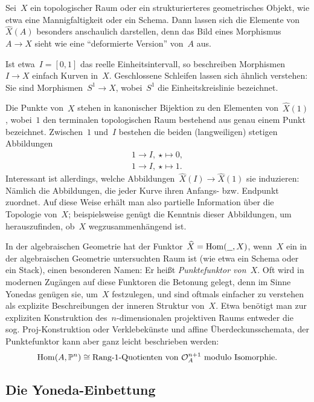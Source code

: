 Sei~$X$ ein topologischer Raum oder ein strukturierteres geometrisches
Objekt, wie etwa eine Mannigfaltigkeit oder ein Schema. Dann lassen sich die Elemente
von~$\widehat X(A)$ besonders anschaulich darstellen, denn das Bild eines
Morphismus~$A \to X$ sieht wie eine "`deformierte Version"' von~$A$ aus.

Ist etwa~$I = [0,1]$ das reelle Einheitsintervall, so beschreiben Morphismen~$I
\to X$ einfach Kurven in~$X$. Geschlossene Schleifen lassen sich ähnlich
verstehen: Sie sind Morphismen~$S^1 \to X$, wobei~$S^1$ die Einheitskreislinie
bezeichnet.

Die Punkte von~$X$ stehen in kanonischer Bijektion zu den Elementen
von~$\widehat X(1)$, wobei~$1$ den terminalen topologischen Raum bestehend aus
genau einem Punkt bezeichnet. Zwischen~$1$ und~$I$ bestehen die beiden
(langweiligen) stetigen Abbildungen
\begin{align*}
  1 \longrightarrow I,\ \star \longmapsto 0, \\
  1 \longrightarrow I,\ \star \longmapsto 1.
\end{align*}
Interessant ist allerdings, welche Abbildungen~$\widehat X(I) \to \widehat X(1)$
sie induzieren: Nämlich die Abbildungen, die jeder Kurve ihren Anfangs- bzw.
Endpunkt zuordnet. Auf diese Weise erhält man also partielle Information über
die Topologie von~$X$; beispielsweise genügt die Kenntnis dieser Abbildungen,
um herauszufinden, ob~$X$ wegzusammenhängend ist.


\begin{bem}In der algebraischen Geometrie hat der Funktor~$\widehat X =
\mathrm{Hom}(\underline{\ \ },X)$, wenn~$X$ ein in der algebraischen Geometrie untersuchten
Raum ist (wie etwa ein Schema oder ein Stack), einen besonderen Namen: Er heißt
\emph{Punktefunktor von~$X$}. Oft wird in modernen Zugängen auf diese Funktoren
die Betonung gelegt, denn im Sinne Yonedas genügen sie, um~$X$
festzulegen, und sind oftmals einfacher zu verstehen als explizite
Beschreibungen der inneren Struktur von~$X$. Etwa benötigt man zur expliziten
Konstruktion des~$n$-dimensionalen projektiven Raums entweder die sog.
Proj-Konstruktion oder Verklebekünste und affine Überdeckunsschemata, der
Punktefunktor kann aber ganz leicht beschrieben werden:
\[ \mathrm{Hom}(A, \mathbb{P}^n) \cong \text{Rang-1-Quotienten von~$\mathcal{O}_A^{n+1}$ modulo
Isomorphie}. \]
\end{bem}


\subsection{Die Yoneda-Einbettung}

